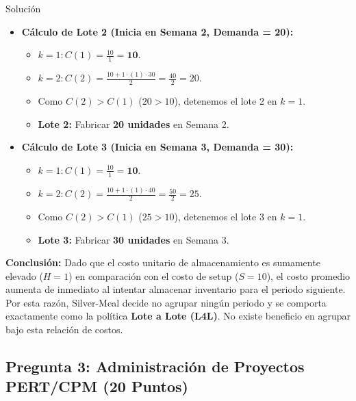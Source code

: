 \documentclass[11pt, a4paper]{article}
\begin{document}
\begin{ejercicio}{Solución}
\begin{itemize}
    \item \textbf{Cálculo de Lote 2 (Inicia en Semana 2, Demanda = 20):}
    \begin{itemize}
      \item $k=1: C(1) = \frac{10}{1} = \mathbf{10}$.
      \item $k=2: C(2) = \frac{10 + 1 \cdot (1) \cdot 30}{2} = \frac{40}{2} = 20$.
      \item Como $C(2) > C(1)$ ($20 > 10$), detenemos el lote 2 en $k=1$.
      \item \textbf{Lote 2:} Fabricar \textbf{20 unidades} en Semana 2.
    \end{itemize}

    \item \textbf{Cálculo de Lote 3 (Inicia en Semana 3, Demanda = 30):}
    \begin{itemize}
      \item $k=1: C(1) = \frac{10}{1} = \mathbf{10}$.
      \item $k=2: C(2) = \frac{10 + 1 \cdot (1) \cdot 40}{2} = \frac{50}{2} = 25$.
      \item Como $C(2) > C(1)$ ($25 > 10$), detenemos el lote 3 en $k=1$.
      \item \textbf{Lote 3:} Fabricar \textbf{30 unidades} en Semana 3.
    \end{itemize}
  \end{itemize}

  \textbf{Conclusión:}
  Dado que el costo unitario de almacenamiento es sumamente elevado ($H=1$) en comparación con el costo de setup ($S=10$), el costo promedio aumenta de inmediato al intentar almacenar inventario para el periodo siguiente. Por esta razón, Silver-Meal decide no agrupar ningún periodo y se comporta exactamente como la política \textbf{Lote a Lote (L4L)}. No existe beneficio en agrupar bajo esta relación de costos.

\end{ejercicio}

\newpage

\subsection*{Pregunta 3: Administración de Proyectos PERT/CPM (20 Puntos)}
\end{document}
